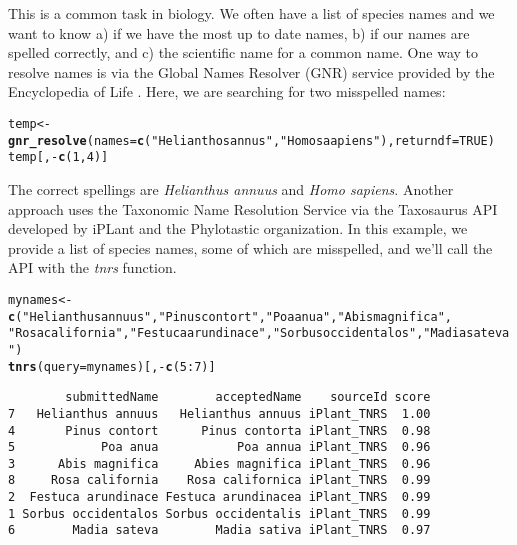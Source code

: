 \documentclass[10pt]{article}\usepackage[]{graphicx}\usepackage[]{color}
\makeatletter
\newcommand{\hlstr}[1]{\textcolor[rgb]{0.192,0.494,0.8}{#1}}%
\newcommand{\hlkwd}[1]{\textcolor[rgb]{0.737,0.353,0.396}{\textbf{#1}}}%
\newenvironment{kframe}{%
 \def\at@end@of@kframe{}%
 \ifinner\ifhmode%
  \def\at@end@of@kframe{\end{minipage}}%
  \begin{minipage}{\columnwidth}%
 \fi\fi%
 \def\FrameCommand##1{\hskip\@totalleftmargin \hskip-\fboxsep
 \colorbox{shadecolor}{##1}\hskip-\fboxsep
     \hskip-\linewidth \hskip-\@totalleftmargin \hskip\columnwidth}%
 \MakeFramed {\advance\hsize-\width
   \@totalleftmargin\z@ \linewidth\hsize
   \@setminipage}}%
 {\par\unskip\endMakeFramed%
 \at@end@of@kframe}
\newenvironment{knitrout}{}{} %
\makeatother
\begin{document}
This is a common task in biology. We often have a list of species names and we want to know a) if we have the most up to date names, b) if our names are spelled correctly, and c) the scientific name for a common name. One way to resolve names is via the Global Names Resolver (GNR) service provided by the Encyclopedia of Life \cite{eolgnr}. Here, we are searching for two misspelled names:

\begin{knitrout}
\color{fgcolor}\begin{kframe}
\begin{alltt}
temp <- \hlkwd{gnr_resolve}(names = \hlkwd{c}(\hlstr{"Helianthos annus"}, \hlstr{"Homo saapiens"}), returndf = TRUE)
temp[, -\hlkwd{c}(1, 4)]
\end{alltt}
\end{kframe}
\end{knitrout}


The correct spellings are \emph{Helianthus annuus} and \emph{Homo sapiens}. Another approach uses the Taxonomic Name Resolution Service via the Taxosaurus API \cite{taxosaurus} developed by iPLant and the Phylotastic organization. In this example, we provide a list of species names, some of which are misspelled, and we'll call the API with the \emph{tnrs} function.

\begin{knitrout}
\color{fgcolor}\begin{kframe}
\begin{alltt}
mynames <- \hlkwd{c}(\hlstr{"Helianthus annuus"}, \hlstr{"Pinus contort"}, \hlstr{"Poa anua"}, \hlstr{"Abis magnifica"}, 
    \hlstr{"Rosa california"}, \hlstr{"Festuca arundinace"}, \hlstr{"Sorbus occidentalos"}, \hlstr{"Madia sateva"})
\hlkwd{tnrs}(query = mynames)[, -\hlkwd{c}(5:7)]
\end{alltt}
\begin{verbatim}
        submittedName        acceptedName    sourceId score
7   Helianthus annuus   Helianthus annuus iPlant_TNRS  1.00
4       Pinus contort      Pinus contorta iPlant_TNRS  0.98
5            Poa anua           Poa annua iPlant_TNRS  0.96
3      Abis magnifica     Abies magnifica iPlant_TNRS  0.96
8     Rosa california    Rosa californica iPlant_TNRS  0.99
2  Festuca arundinace Festuca arundinacea iPlant_TNRS  0.99
1 Sorbus occidentalos Sorbus occidentalis iPlant_TNRS  0.99
6        Madia sateva        Madia sativa iPlant_TNRS  0.97
\end{verbatim}
\end{kframe}
\end{knitrout}
\end{document}
